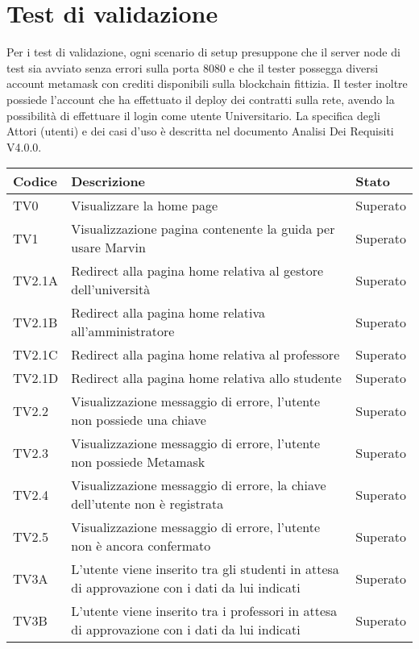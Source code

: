 \documentclass[PianoDiQualifica.tex]{subfiles}
\begin{document}
\chapter{Test di validazione}

Per i test di validazione, ogni scenario di setup presuppone che il server node di test sia avviato senza errori sulla porta 8080 e che il tester possegga diversi account metamask con crediti disponibili sulla blockchain fittizia.
Il tester inoltre possiede l'account che ha effettuato il deploy dei contratti sulla rete, avendo la possibilità di effettuare il login come utente Universitario.
La specifica degli Attori (utenti) e dei casi d'uso è descritta nel documento Analisi Dei Requisiti V4.0.0.

\begin{longtable}[H]{P{2cm}P{8.5cm}P{3cm}}
	\color{CHeaderText}\textbf{Codice} & 
	\color{CHeaderText}\textbf{Descrizione} & 
	\color{CHeaderText}\textbf{Stato}\\
	\endhead
	TV0 & Visualizzare la home page & Superato \\
	TV1 & Visualizzazione pagina contenente la guida per usare Marvin & Superato \\
	TV2.1A & Redirect alla pagina home relativa al gestore dell'università & Superato \\
	TV2.1B & Redirect alla pagina home relativa all'amministratore & Superato \\
	TV2.1C & Redirect alla pagina home relativa al professore & Superato \\
	TV2.1D & Redirect alla pagina home relativa allo studente & Superato \\
	TV2.2 & Visualizzazione messaggio di errore, l'utente non possiede una chiave & Superato \\ 
	TV2.3 & Visualizzazione messaggio di errore, l'utente non possiede Metamask & Superato \\ 
	TV2.4 & Visualizzazione messaggio di errore, la chiave dell'utente non è registrata & Superato \\ 
	TV2.5 & Visualizzazione messaggio di errore, l'utente non è ancora confermato & Superato \\ 
	TV3A & L'utente viene inserito tra gli studenti in attesa di approvazione con i dati da lui indicati & Superato \\ 
	TV3B & L'utente viene inserito tra i professori in attesa di approvazione con i dati da lui indicati & Superato \\ 

\end{longtable}
\end{document}

